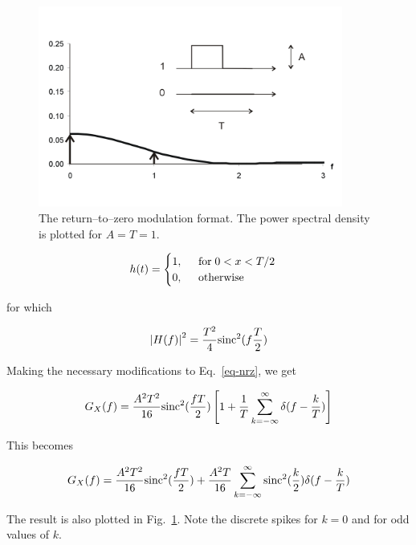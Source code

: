 \begin{figure}
\centering
\includegraphics[width=10cm]{stochastic/figures/rz}
\caption{The return--to--zero modulation format. The power spectral density is plotted for $A=T=1$.}
\label{fig-rz}
\end{figure}


\begin{equation}
h(t) = 
\begin{cases}
1, \hspace{0.5cm} {\rm for } \hspace{0.1cm} 0 < x < T/2 \\ 
0, \hspace{0.5cm} {\rm otherwise}
\end{cases}
\end{equation} 

for which

\begin{equation}
\left | H(f) \right |^2 = \frac{T^2}{4} {\rm sinc}^2 (f \frac{T}{2})
\end{equation} 

Making the necessary modifications to Eq.~\ref{eq-nrz}, we get

\begin{equation}
G_X(f) =  \frac{A^2 T^2}{16} {\rm sinc}^2 (\frac{f T}{2}) \left [ 1 + \frac{1}{T} \sum_{k=-\infty}^{\infty} \delta(f-\frac{k}{T}) \right ]
\end{equation} 

This becomes

\begin{equation}
G_X(f) =  \frac{A^2 T^2}{16} {\rm sinc}^2 (\frac{f T}{2}) +  \frac{A^2 T}{16} \sum_{k=-\infty}^{\infty}{\rm sinc}^2 (\frac{k}{2}) \delta(f-\frac{k}{T})
\end{equation} 

The result is also plotted in Fig.~\ref{fig-rz}. Note the discrete spikes for $k=0$ and for odd values of $k$.

